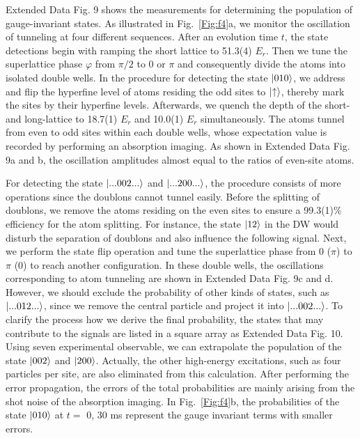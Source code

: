 \documentclass[aps,prl,twocolumn,superscriptaddress,footinbib,linenumbers]{revtex4}
\begin{document}
Extended Data Fig. 9 shows the measurements for determining the population of gauge-invariant states. As illustrated in Fig.~\ref{Fig:f4}a, we monitor the oscillation of tunneling at four different sequences. After an evolution time $t$, the state detections begin with ramping the short lattice to 51.3(4) $E_r$. Then we tune the superlattice phase $\varphi$ from $\pi/2$ to 0 or $\pi$ and consequently divide the atoms into isolated double wells. In the procedure for detecting the state $\ket{010}$, we address and flip the hyperfine level of atoms residing the odd sites to $\ket{\uparrow}$, thereby mark the sites by their hyperfine levels. Afterwards, we quench the depth of the short- and long-lattice to 18.7(1) $E_r$ and 10.0(1) $E_r$ simultaneously. The atoms tunnel from even to odd sites within each double wells, whose expectation value is recorded by performing an absorption imaging. As shown in Extended Data Fig. 9a and b, the oscillation amplitudes almost equal to the ratios of even-site atoms.

For detecting the state $\ket{...002...}$ and $\ket{...200...}$, the procedure consists of more operations since the doublons cannot tunnel easily. Before the splitting of doublons, we remove the atoms residing on the even sites to ensure a 99.3(1)\% efficiency for the atom splitting. For instance, the state $\ket{12}$ in the DW would disturb the separation of doublons and also influence the following signal. Next, we perform the state flip operation and tune the superlattice phase from $0$ ($\pi$) to $\pi$ (0) to reach another configuration. In these double wells, the oscillations corresponding to atom tunneling are shown in Extended Data Fig. 9c and d. However, we should exclude the probability of other kinds of states, such as $\ket{...012...}$, since we remove the central particle and project it into $\ket{...002...}$. To clarify the process how we derive the final probability, the states that may contribute to the signals are listed  in a square array as Extended Data Fig. 10. Using seven experimental observable, we can extrapolate the population of the state $\ket{002}$ and $\ket{200}$. Actually, the other high-energy excitations, such as four particles per site, are also eliminated from this calculation. After performing the error propagation, the errors of the total probabilities are mainly arising from the shot noise of the absorption imaging. In Fig.~\ref{Fig:f4}b, the probabilities of the state $\ket{010}$ at $t=$ 0, 30 ms represent the gauge invariant terms with smaller errors.
\end{document}
